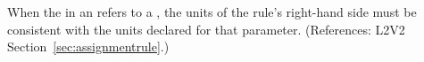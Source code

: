 When the  in an \AssignmentRule refers to a \Parameter, the
units of the rule's right-hand side must be consistent with the units
declared for that parameter.  (References: L2V2
Section~\ref{sec:assignmentrule}.)
